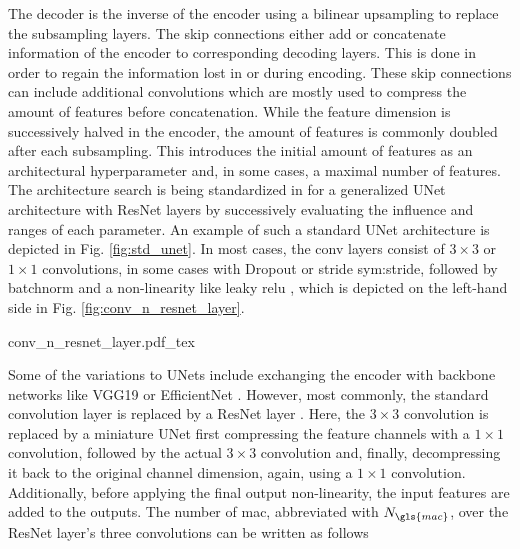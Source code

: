 The decoder is the inverse of the encoder using a bilinear upsampling \cite{odena2016deconvolution} to replace the subsampling layers. The skip connections either add or concatenate information of the encoder to corresponding decoding layers. This is done in order to regain the information lost in or during encoding. These skip connections can include additional convolutions which are mostly used to compress the amount of features before concatenation. While the feature dimension is successively halved in the encoder, the amount of features is commonly doubled after each subsampling. This introduces the initial amount of features as an architectural hyperparameter and, in some cases, a maximal number of features. The architecture search is being standardized in \cite{radosavovic2020designing} for a generalized UNet architecture with ResNet layers by successively evaluating the influence and ranges of each parameter. An example of such a standard UNet architecture is depicted in Fig. \ref{fig:std_unet}. In most cases, the \gls{conv} layers consist of $3 \times 3$ or $1 \times 1$ convolutions, in some cases with Dropout \cite{srivastava2014dropout} or stride \gls{sym:stride}, followed by \gls{batchnorm} \cite{ioffe2015batch} and a non-linearity like leaky \gls{relu} \cite{maas2013rectifier}, which is depicted on the left-hand side in Fig. \ref{fig:conv_n_resnet_layer}.
\begin{center}
	{conv_n_resnet_layer.pdf_tex}
\end{center}
Some of the variations to UNets include exchanging the encoder with backbone networks like VGG19 \cite{simonyan2014very,wulff2018early} or EfficientNet \cite{tan2019efficientnet,philion2020lift}. However, most commonly, the standard convolution layer is replaced by a ResNet layer \cite{he2016deep,wirges2018evidential,reiher2020sim2real,roddick2020predicting,philion2020lift}. Here, the $3 \times 3$ convolution is replaced by a miniature UNet first compressing the feature channels with a $1\times 1$ convolution, followed by the actual $3 \times 3$ convolution and, finally, decompressing it back to the original channel dimension, again, using a $1 \times 1$ convolution. Additionally, before applying the final output non-linearity, the input features are added to the outputs. The number of \gls{mac}, abbreviated with $N_{\gls{mac}}$, over the ResNet layer's three convolutions can be written as follows
